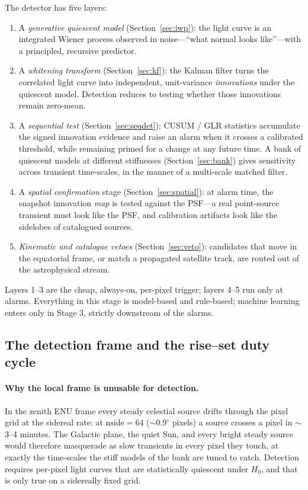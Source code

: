 \documentclass[11pt]{article}
\begin{document}
The detector has five layers:
\begin{enumerate}[leftmargin=*]
  \item A \emph{generative quiescent model} (Section~\ref{sec:iwp}): the light curve is an
        integrated Wiener process observed in noise---``what normal looks like''---with a
        principled, recursive predictor.
  \item A \emph{whitening transform} (Section~\ref{sec:kf}): the Kalman filter turns the correlated
        light curve into independent, unit-variance \emph{innovations} under the quiescent model.
        Detection reduces to testing whether those innovations remain zero-mean.
  \item A \emph{sequential test} (Section~\ref{sec:seqdet}): CUSUM / GLR statistics accumulate the
        signed innovation evidence and raise an alarm when it crosses a calibrated threshold,
        while remaining primed for a change at any future time. A bank of quiescent models at
        different stiffnesses (Section~\ref{sec:bank}) gives sensitivity across transient
        time-scales, in the manner of a multi-scale matched filter.
  \item A \emph{spatial confirmation} stage (Section~\ref{sec:spatial}): at alarm time, the
        snapshot innovation \emph{map} is tested against the PSF---a real point-source transient
        must look like the PSF, and calibration artifacts look like the sidelobes of catalogued
        sources.
  \item \emph{Kinematic and catalogue vetoes} (Section~\ref{sec:veto}): candidates that move in
        the equatorial frame, or match a propagated satellite track, are routed out of the
        astrophysical stream.
\end{enumerate}
Layers 1--3 are the cheap, always-on, per-pixel trigger; layers 4--5 run only at alarms. Everything
in this stage is model-based and rule-based; machine learning enters only in Stage 3, strictly
downstream of the alarms.

\subsection{The detection frame and the rise--set duty cycle}
\label{sec:frame}

\paragraph{Why the local frame is unusable for detection.} In the zenith ENU frame every steady
celestial source drifts through the pixel grid at the sidereal rate: at $\mathrm{nside}=64$
($\sim\!0.9^\circ$ pixels) a source crosses a pixel in $\sim$3--4 minutes. The Galactic plane, the
quiet Sun, and every bright steady source would therefore masquerade as slow transients in every
pixel they touch, at exactly the time-scales the stiff models of the bank are tuned to catch.
Detection requires per-pixel light curves that are statistically quiescent under $H_0$, and that is
only true on a sidereally fixed grid.
\end{document}
